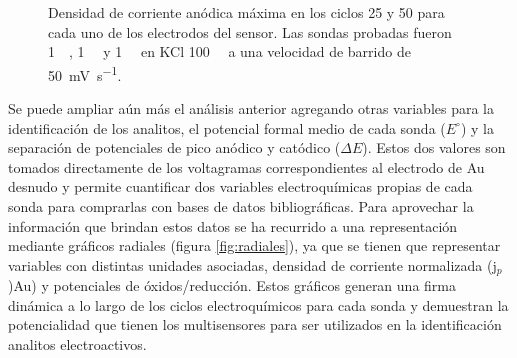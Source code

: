 \begin{figure}[ht!]
\begin{subfigure}[t]{0.329\textwidth}
		 	   \end{subfigure}
		      	\caption[Corriente de pico en distintos ciclos voltamperometricos]{Densidad de corriente anódica máxima en los ciclos 25 y 50 para cada uno de los electrodos del sensor. Las sondas probadas fueron \fc \SI{1}{\milli\Molar}, \fe\space \SI{1}{\milli\Molar} y \ru\space \SI{1}{\milli\Molar} en KCl \SI{100}{\milli\Molar} a una velocidad de barrido de \SI{50}{\milli\volt\per\second}.}
		      	\label{fig:barras}
		      	\end{figure}
     
	Se puede ampliar aún más el análisis anterior agregando otras variables para la identificación de los analitos, el potencial formal medio de cada sonda ($E^{\circ}$) y la separación de potenciales de pico anódico y catódico ($\Delta E$). Estos dos valores son tomados directamente de los voltagramas correspondientes al electrodo de Au desnudo y permite cuantificar dos variables electroquímicas propias de cada sonda para comprarlas con bases de datos bibliográficas. Para aprovechar la información que brindan estos datos se ha recurrido a una representación mediante gráficos radiales (figura \ref{fig:radiales}), ya que se tienen que representar variables con distintas unidades asociadas, densidad de corriente normalizada (j$_p$){Au}) y potenciales de óxidos/reducción. Estos gráficos generan una firma dinámica a lo largo de los ciclos electroquímicos  para cada sonda y demuestran la potencialidad que tienen los multisensores para ser utilizados en la identificación analitos electroactivos.
		
